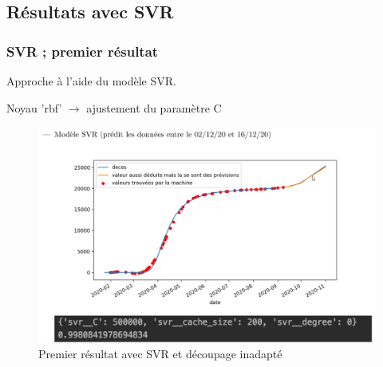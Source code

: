 \documentclass{beamer}
\begin{document}
\subsection{Résultats avec SVR}
\begin{frame}
	\frametitle{SVR ; premier résultat}
	Approche à l'aide du modèle SVR. 
	
	Noyau 'rbf' $\rightarrow$ ajustement du paramètre C
	\begin{figure}[tc]
		\includegraphics[scale=0.2]{SVR_premierdecoup}
		\centering
		\caption{Premier résultat avec SVR et découpage inadapté}
	\end{figure}
\end{frame}
\end{document}

